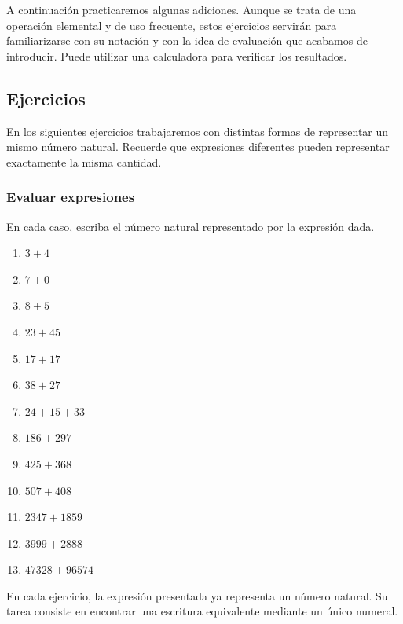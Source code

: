 A continuación practicaremos algunas adiciones. Aunque se trata de una operación elemental y de uso frecuente, estos ejercicios servirán para familiarizarse con su notación y con la idea de evaluación que acabamos de introducir. Puede utilizar una calculadora para verificar los resultados.

\subsection*{Ejercicios}

En los siguientes ejercicios trabajaremos con distintas formas de representar un mismo número natural. Recuerde que expresiones diferentes pueden representar exactamente la misma cantidad.

\subsubsection*{Evaluar expresiones}

En cada caso, escriba el número natural representado por la expresión dada.

\begin{enumerate}
\item \(3+4\)

\item \(7+0\)

\item \(8+5\)

\item \(23+45\)

\item \(17+17\)

\item \(38+27\)

\item \(24+15+33\)

\item \(186+297\)

\item \(425+368\)

\item \(507+408\)

\item \(2347+1859\)

\item \(3999+2888\)

\item \(47328+96574\)
\end{enumerate}

En cada ejercicio, la expresión presentada ya representa un número natural. Su tarea consiste en encontrar una escritura equivalente mediante un único numeral.

